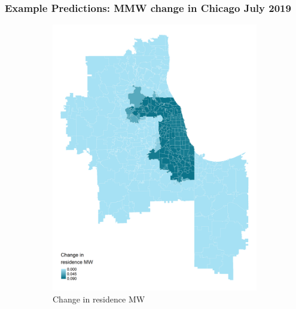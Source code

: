 \documentclass[aspectratio=169, t]{beamer}
\begin{document}
\begin{frame}[label = example_pred_chi_07_2019]
    \frametitle{Example Predictions: MMW change in Chicago July 2019}
    
    \begin{figure}
        \begin{subfigure}{0.33\textwidth}
            \includegraphics[width = 0.99\textwidth]{maps_events/output/chicago_2019-6_statutory_mw.png}
            \caption*{Change in residence MW}
        \end{subfigure}%
        \begin{subfigure}{0.33\textwidth}

\end{subfigure}
\end{figure}
\end{frame}
\end{document}
